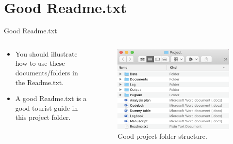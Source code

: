 \documentclass{beamer}
\begin{document}
\section{Good Readme.txt}	
\begin{frame}{Good Readme.txt}
\begin{columns}
	\begin{column}{0.5\textwidth} 
	\begin{itemize}
	\item You should illustrate how to use these documents/folders in the Readme.txt. 
	\item  A good Readme.txt is a good tourist guide in this project folder.

	\end{itemize}
	\end{column}
	
	\begin{column}{0.5\textwidth}
	\begin{figure}
			\includegraphics[scale=0.4]{image/structure}
			\caption{Good project folder structure.}
	\end{figure}
	\end{column}
	\end{columns}
\end{frame}

\end{document}
